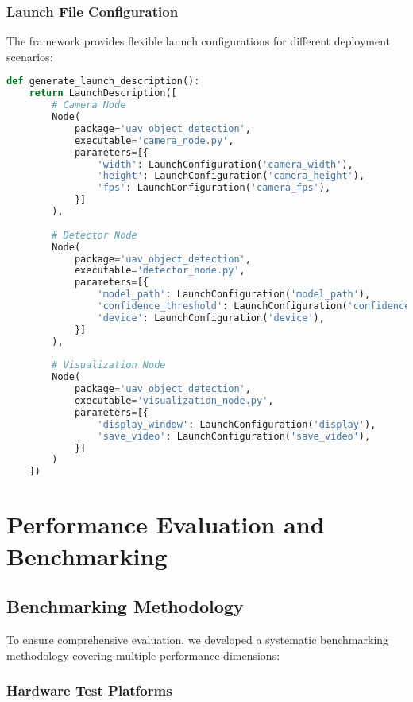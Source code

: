 \documentclass[12pt,a4paper]{article}
\begin{document}
\subsubsection{Launch File Configuration}

The framework provides flexible launch configurations for different deployment scenarios:

\begin{lstlisting}[language=Python, caption=Launch File Example]
def generate_launch_description():
    return LaunchDescription([
        # Camera Node
        Node(
            package='uav_object_detection',
            executable='camera_node.py',
            parameters=[{
                'width': LaunchConfiguration('camera_width'),
                'height': LaunchConfiguration('camera_height'),
                'fps': LaunchConfiguration('camera_fps'),
            }]
        ),
        
        # Detector Node
        Node(
            package='uav_object_detection',
            executable='detector_node.py',
            parameters=[{
                'model_path': LaunchConfiguration('model_path'),
                'confidence_threshold': LaunchConfiguration('confidence'),
                'device': LaunchConfiguration('device'),
            }]
        ),
        
        # Visualization Node
        Node(
            package='uav_object_detection',
            executable='visualization_node.py',
            parameters=[{
                'display_window': LaunchConfiguration('display'),
                'save_video': LaunchConfiguration('save_video'),
            }]
        )
    ])
\end{lstlisting}

\section{Performance Evaluation and Benchmarking}

\subsection{Benchmarking Methodology}

To ensure comprehensive evaluation, we developed a systematic benchmarking methodology covering multiple performance dimensions:

\subsubsection{Hardware Test Platforms}
\end{document}
